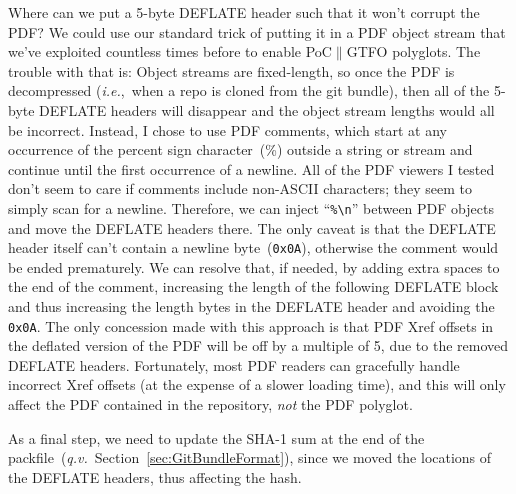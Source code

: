 \documentclass{article}
\begin{document}
Where can we put a 5-byte DEFLATE header such that it won't corrupt
the PDF? We could use our standard trick of putting it in a PDF object
stream that we've exploited countless times before to enable
PoC$\|$GTFO polyglots. The trouble with that is: Object streams are
fixed-length, so once the PDF is decompressed (\textit{i.e.},~when a
repo is cloned from the git bundle), then all of the 5-byte DEFLATE
headers will disappear and the object stream lengths would all be
incorrect. Instead, I chose to use PDF comments, which start at any
occurrence of the percent sign character~(\%) outside a string or
stream and continue until the first occurrence of a newline.  All of
the PDF viewers I tested don't seem to care if comments include
non-ASCII characters; they seem to simply scan for a
newline. Therefore, we can inject ``\texttt{\%\textbackslash n}''
between PDF objects and move the DEFLATE headers there. The only
caveat is that the DEFLATE header itself can't contain a newline
byte~(\texttt{0x0A}), otherwise the comment would be ended
prematurely.  We can resolve that, if needed, by adding extra spaces
to the end of the comment, increasing the length of the following
DEFLATE block and thus increasing the length bytes in the DEFLATE
header and avoiding the \texttt{0x0A}. The only concession made with
this approach is that PDF Xref offsets in the deflated version of the
PDF will be off by a multiple of 5, due to the removed DEFLATE
headers. Fortunately, most PDF readers can gracefully handle incorrect
Xref offsets (at the expense of a slower loading time), and this will
only affect the PDF contained in the repository, \emph{not} the PDF
polyglot.

As a final step, we need to update the SHA-1 sum at the end of the
packfile~(\textit{q.v.}~Section~\ref{sec:GitBundleFormat}), since we
moved the locations of the DEFLATE headers, thus affecting the hash.
\end{document}
